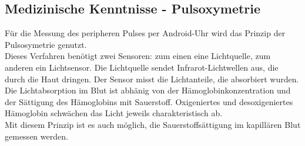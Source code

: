 \subsection{Medizinische Kenntnisse - Pulsoxymetrie} 
Für die Messung des peripheren Pulses per Android-Uhr wird das Prinzip der Pulsosymetrie genutzt. \\
Dieses Verfahren benötigt zwei Sensoren: zum einen eine Lichtquelle, zum anderen ein Lichtsensor. Die Lichtquelle sendet Infrarot-Lichtwellen aus, die durch die Haut dringen. Der Sensor misst die Lichtanteile, die absorbiert wurden. \\
Die Lichtabsorption im Blut ist abhänig von der Hämoglobinkonzentration und der Sättigung des Hämoglobins mit Sauerstoff. Oxigeniertes und desoxigeniertes Hämoglobin schwächen das Licht jeweils charakteristisch ab. \\
Mit diesem Prinzip ist es auch möglich, die Sauerstoffsättigung im kapillären Blut gemessen werden.\






